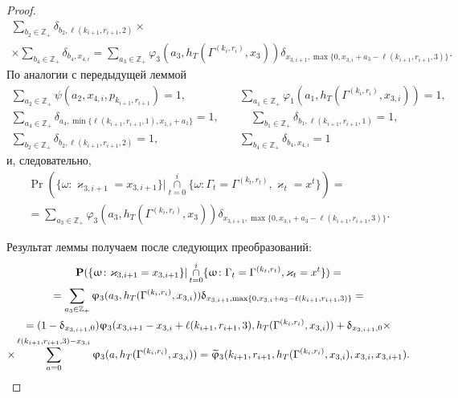 \begin{proof}
\begin{multline*}
\sum_{b_2\in \mathbb{Z}_+}  \delta_{b_2, \ell(k_{i+1}, r_{i+1}, 2)} \times \\
\times  \sum_{b_4\in \mathbb{Z}_+}\delta_{b_4, x_{4, i}} =  \sum_{a_3\in \mathbb{Z}_+} \varphi_3(a_3, h_T(\Gamma^{(k_i, r_i)}, x_3))  \delta_{x_{3, i+1}, \max\{0, x_{3, i}+a_3-\ell(k_{i+1}, r_{i+1}, 3)\}}.
\end{multline*}
По аналогии с передыдущей леммой
\begin{align*}
 \sum_{a_2\in \mathbb{Z}_+} \psi(a_2, x_{4, i},  p_{k_{i+1}, r_{i+1}}) = 1, & \quad
\sum_{a_1\in \mathbb{Z}_+}  \varphi_1(a_1, h_T(\Gamma^{(k_i, r_i)}, x_{3, i})) = 1, \\ \sum_{a_4\in \mathbb{Z}_+} \delta_{a_4, \min{\{\ell(k_{i+1}, r_{i+1}, 1),  x_{1, i}+a_1}\}} = 1, &\quad \quad \sum_{b_1\in \mathbb{Z}_+} \delta_{b_1, \ell(k_{i+1}, r_{i+1}, 1)} = 1, \\
\sum_{b_2\in \mathbb{Z}_+}  \delta_{b_2, \ell(k_{i+1}, r_{i+1}, 2)} = 1, &\quad
  \sum_{b_4\in \mathbb{Z}_+}\delta_{b_4, x_{4, i}} = 1
\end{align*}
и,  следовательно, 
\begin{multline*}
  \Pr (\{ \omega \colon \varkappa_{3, i+1} = x_{3, i+1}\} |\mathop{\cap}\limits_{t=0}^{i}\{\omega\colon \Gamma_t=\Gamma^{(k_t, r_t)},  \varkappa_t=x^t\})=\\=  \sum_{a_3\in \mathbb{Z}_+} \varphi_3(a_3, h_T(\Gamma^{(k_i, r_i)}, x_3))  \delta_{x_{3, i+1}, \max\{0, x_{3, i}+a_3-\ell(k_{i+1}, r_{i+1}, 3)\}}.
\end{multline*}

Результат леммы получаем после следующих преобразований:
\begin{multline*}
\Pr (\{ \omega \colon \varkappa_{3, i+1} = x_{3, i+1}\} |\mathop{\cap}\limits_{t=0}^{i}\{\omega\colon \Gamma_t=\Gamma^{(k_t, r_t)},  \varkappa_t=x^t\})=\\
=\sum_{a_3\in \mathbb{Z}_+} \varphi_3(a_3, h_T(\Gamma^{(k_i, r_i)}, x_{3, i}))  \delta_{x_{3, i+1}, \max\{0, x_{3, i}+a_3-\ell(k_{i+1}, r_{i+1}, 3)\}}  = \\
=(1 - \delta_{x_{3, i+1}, 0})\varphi_3(x_{3, i+1}-x_{3, i} + \ell(k_{i+1}, r_{i+1}, 3), h_T(\Gamma^{(k_i, r_i)}, x_{3, i})) 
+\delta_{x_{3, i+1}, 0}\times\\\times\sum_{a=0}^{\ell(k_{i+1}, r_{i+1}, 3)-x_{3, i}} \varphi_3(a, h_T(\Gamma^{(k_i, r_i)}, x_{3, i})) 
=\widetilde{\varphi}_3(k_{i+1}, r_{i+1}, h_T(\Gamma^{(k_i, r_i)}, x_{3, i}), x_{3, i}, x_{3, i+1}).\qedhere
\end{multline*}
\end{proof}

